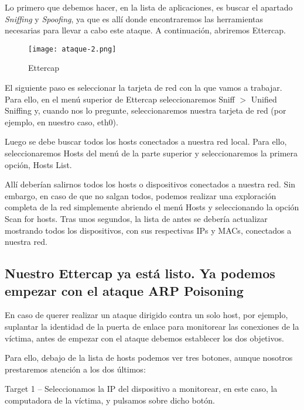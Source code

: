 Lo primero que debemos hacer, en la lista de aplicaciones, es buscar el apartado 
\emph{Sniffing} y \emph{Spoofing}, ya que es allí donde encontraremos las herramientas necesarias
 para llevar a cabo este ataque. A continuación, abriremos Ettercap.

\begin{center}
    \begin{figure}   
       \begin{center}
          \texttt{[image: ataque-2.png]}
       \end{center}
       \caption{Ettercap}
    \end{figure}
 \end{center}

El siguiente paso es seleccionar la tarjeta de red con la que vamos a trabajar. Para 
ello, en el menú superior de Ettercap seleccionaremos Sniff $>$ Unified Sniffing y, 
cuando nos lo pregunte, seleccionaremos nuestra tarjeta de red (por ejemplo, en 
nuestro caso, eth0).

Luego se debe buscar todos los hosts conectados a nuestra red local. Para ello, 
seleccionaremos Hosts del menú de la parte superior y seleccionaremos la primera 
opción, Hosts List.

Allí deberían salirnos todos los hosts o dispositivos conectados a nuestra red. 
Sin embargo, en caso de que no salgan todos, podemos realizar una exploración 
completa de la red simplemente abriendo el menú Hosts y seleccionando la opción 
Scan for hosts. Tras unos segundos, la lista de antes se debería actualizar 
mostrando todos los dispositivos, con sus respectivas IPs y MACs, conectados 
a nuestra red.



\subsection{Nuestro Ettercap ya está listo. Ya podemos empezar con el ataque ARP Poisoning}

En caso de querer realizar un ataque dirigido contra un solo host, por ejemplo, 
suplantar la identidad de la puerta de enlace para monitorear las conexiones 
de la víctima, antes de empezar con el 
ataque debemos establecer los dos objetivos.

Para ello, debajo de la lista de hosts podemos ver tres botones, aunque nosotros 
prestaremos atención a los dos últimos:

    Target 1 – Seleccionamos la IP del dispositivo a monitorear, en este caso, 
    la computadora de la víctima, y pulsamos sobre dicho botón.

